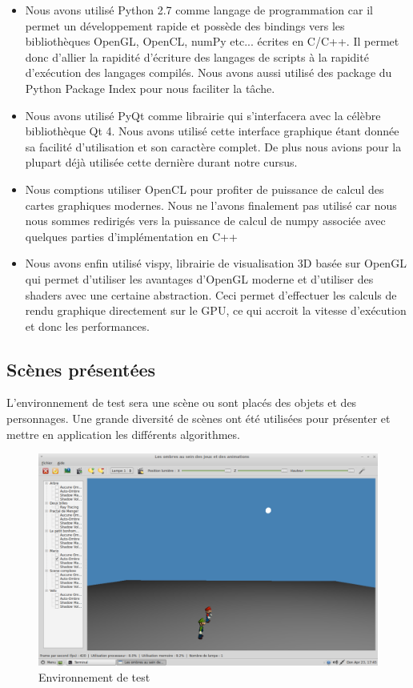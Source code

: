 \documentclass[a4paper,10pt]{report}
\begin{document}
\begin{itemize}
\item{Nous avons utilisé Python 2.7 comme langage de programmation car il permet un développement rapide et possède des bindings vers les bibliothèques OpenGL, OpenCL, numPy etc... écrites en C/C++. Il permet donc d'allier la rapidité d'écriture des langages de scripts à la rapidité d'exécution des langages compilés. Nous avons aussi utilisé des package du Python Package Index pour nous faciliter la t\^ache.}

\item{Nous avons utilisé PyQt comme librairie qui s'interfacera avec la célèbre bibliothèque Qt 4. Nous avons utilisé cette interface graphique étant donnée sa facilité d'utilisation et son caractère complet. De plus nous avions pour la plupart déjà utilisée cette dernière durant notre cursus.}

\item{Nous comptions utiliser OpenCL pour profiter de puissance de calcul des cartes graphiques modernes. Nous ne l'avons finalement pas utilisé car nous nous sommes redirigés vers la puissance de calcul de numpy associée avec quelques parties d'implémentation en C++}

\item{Nous avons enfin utilisé vispy, librairie de visualisation 3D basée sur OpenGL qui permet d'utiliser les avantages d'OpenGL moderne et d'utiliser des shaders avec une certaine abstraction. Ceci permet d'effectuer les calculs de rendu graphique directement sur le GPU, ce qui accroit la vitesse d'exécution et donc les performances.
}
\end{itemize}

\subsection{Scènes présentées}

L'environnement de test sera une scène ou sont placés des objets et des personnages. Une grande diversité de scènes ont été utilisées pour présenter et mettre en application les différents algorithmes. 

\begin{figure}[H]
\includegraphics[scale=0.31]{images/exemple-scene.png}
\centering
\caption{Environnement de test}
\end{figure}
\end{document}
